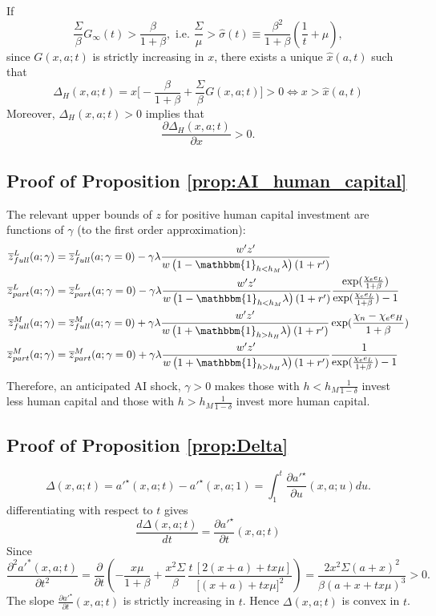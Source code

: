 \documentclass[12pt]{article}
\begin{document}
If 
\begin{equation} \label{app:Ginfty}
    \frac{\Sigma}{\beta}G_\infty(t)>\frac{\beta}{1+\beta}, \text{ i.e. } \frac{\Sigma}{\mu} > \hat{\sigma}(t) \equiv \frac{\beta^2}{1+\beta}(\frac{1}{t}+\mu),
\end{equation}
since $G(x,a;t)$ is strictly increasing in $x$, there exists a unique $\hat{x}(a,t)$ such that  
\[
\Delta_H(x,a;t) = x\big[-\frac{\beta}{1+\beta} + \frac{\Sigma}{\beta}G(x,a;t)\big]>0 \Leftrightarrow x>\hat{x}(a,t)
\]
Moreover, $\Delta_H(x,a;t)>0$ implies that
\[
\frac{\partial \Delta_H(x,a;t)}{\partial x} >0.
\]

\subsection{Proof of Proposition \ref{prop:AI_human_capital}}
The relevant upper bounds of $z$ for positive human capital investment are functions of $\gamma$ (to the first order approximation):
\begin{align*}
    \overline{z}^L_{full}(a;\gamma)&= \overline{z}^L_{full}(a;\gamma=0) - \gamma \lambda  \frac{w'z'}{w\left(1-\mathbbm{1}_{h < h_M}\lambda\right)(1+r')}\\
    \overline{z}^L_{part}(a;\gamma)&= \overline{z}^L_{part}(a;\gamma=0) - \gamma \lambda \frac{w'z'}{w\left(1-\mathbbm{1}_{h < h_M}\lambda\right)(1+r')}\frac{\exp(\frac{\chi_e e_L}{1+\beta})}{\exp(\frac{\chi_e e_L}{1+\beta})-1} \\
    \overline{z}^M_{full}(a;\gamma)&=\overline{z}^M_{full}(a;\gamma=0) + \gamma \lambda \frac{w'z'}{w\left(1+\mathbbm{1}_{h > h_H}\lambda\right)(1+r')}\exp(\frac{\chi_n-\chi_e e_H}{1+\beta})\\
    \overline{z}^M_{part}(a;\gamma)&= \overline{z}^M_{part}(a;\gamma=0) + \gamma \lambda \frac{w'z'}{w\left(1+\mathbbm{1}_{h > h_H}\lambda\right)(1+r')}\frac{1}{\exp(\frac{\chi_e e_L}{1+\beta})-1}
\end{align*}
Therefore, an anticipated AI shock, $\gamma>0$ makes those with $h<h_M\frac{1}{1-\delta}$ invest less human capital and those with $h>h_M\frac{1}{1-\delta}$ invest more human capital.


\subsection{Proof of Proposition \ref{prop:Delta}}

\[
    \Delta(x,a;t) = a'^\star(x,a;t) - a'^\star(x,a;1) = \int_1^t \frac{\partial a'^\star}{\partial u}(x,a;u) du.
\]
differentiating with respect to $t$ gives
\[\frac{d \Delta(x,a;t)}{d t} = \frac{\partial a'^\star}{\partial t}(x,a;t) 
\]
Since
\begin{equation}
    \frac{\partial^2 a'^*(x,a;t)}{\partial t^2}  = \frac{\partial}{\partial t} \left( -\frac{x\mu}{1+\beta}
    +
    \frac{x^2 \Sigma}{\beta}\,
    \frac{t\,[2(x+a) + t x \mu]}{\big[(x+a) + t x \mu\big]^2} \right) = \frac{2x^2\Sigma(a+x)^2}{\beta(a +x + tx\mu)^3} > 0.
\end{equation}
The slope $\frac{\partial a'^\star}{\partial t}(x,a;t)$ is strictly increasing in $t$. Hence $\Delta(x,a;t)$ is convex in $t$.
\end{document}
